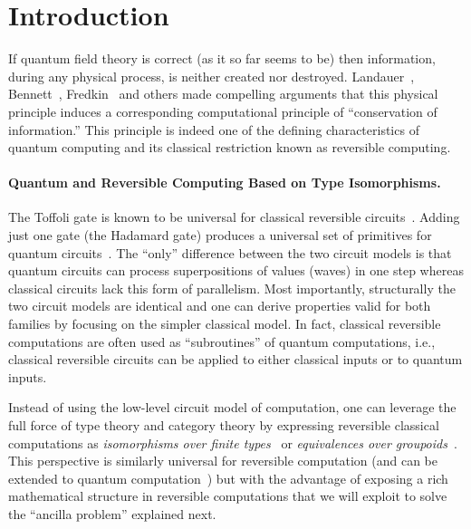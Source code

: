 \documentclass[sigplan,10pt,review,anonymous]{acmart}
\begin{document}






\vspace{-0.5\baselineskip}

\section{Introduction}

If quantum field theory is correct (as it so far seems to be) then
information, during any physical process, is neither created nor
destroyed. Landauer~\cite{Landauer:1961,Landauer,bennett1985fundamental},
Bennett~\cite{bennett2010notes,bennett2003notes,Bennett:1973:LRC},
Fredkin~\cite{fredkin1982conservative} and others made compelling
arguments that this physical principle induces a corresponding
computational principle of ``conservation of information.'' This
principle is indeed one of the defining characteristics of quantum
computing and its classical restriction known as reversible computing.

\paragraph*{Quantum and Reversible Computing Based on Type
  Isomorphisms.} The Toffoli gate is known to be universal for
classical reversible circuits~\cite{Toffoli:1980}. Adding just one
gate (the Hadamard gate) produces a universal set of primitives for
quantum circuits~\cite{hadtoffuniv}. The ``only'' difference between
the two circuit models is that quantum circuits can process
superpositions of values (waves) in one step whereas classical
circuits lack this form of parallelism. Most importantly, structurally
the two circuit models are identical and one can derive properties
valid for both families by focusing on the simpler classical model. In
fact, classical reversible computations are often used as
``subroutines'' of quantum computations, i.e., classical reversible
circuits can be applied to either classical inputs or to quantum
inputs.

Instead of using the low-level circuit model of computation,
one can leverage the full force of type theory and category theory by
expressing reversible classical computations as \emph{isomorphisms
  over finite types}~\cite{Fiore:2004,James:2012:IE:2103656.2103667}
or \emph{equivalences over
  groupoids}~\cite{DBLP:conf/esop/CaretteS16}. This perspective is
similarly universal for reversible computation (and can be extended to
quantum computation~\cite{10.1007/978-3-319-89366-2_19}) but with the
advantage of exposing a rich mathematical structure in reversible
computations that we will exploit to solve the ``ancilla problem''
explained next.
\end{document}
